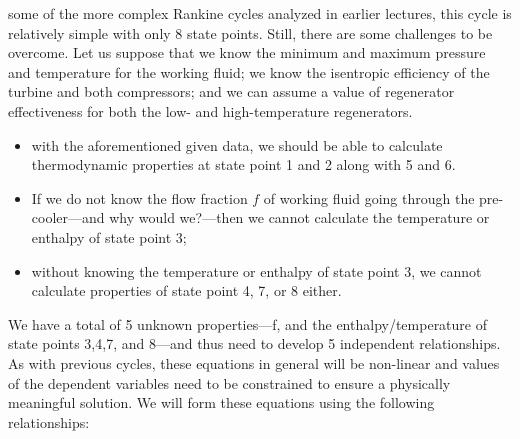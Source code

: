  some of the more complex Rankine cycles analyzed in earlier lectures, this cycle is relatively simple with only 8 state points.  Still, there are some challenges to be overcome.  Let us suppose that we know the minimum and maximum pressure and temperature for the working fluid; we know the isentropic efficiency of the turbine and both compressors; and we can assume a value of regenerator effectiveness for both the low- and high-temperature regenerators.
\begin{itemize}
\item with the aforementioned given data, we should be able to calculate thermodynamic properties at state point 1 and 2 along with 5 and 6. 
\item If we do not know the flow fraction $f$ of working fluid going through the pre-cooler---and why would we?---then we cannot calculate the temperature or enthalpy of state point 3;
\item without knowing the temperature or enthalpy of state point 3, we cannot calculate properties of state point 4, 7, or 8 either.
\end{itemize}
We have a total of 5 unknown properties---f, and the enthalpy/temperature of state points 3,4,7, and 8---and thus need to develop 5 independent relationships.  As with previous cycles, these equations in general will be non-linear and values of the dependent variables need to be constrained to ensure a physically meaningful solution.  We will form these equations using the following relationships:
